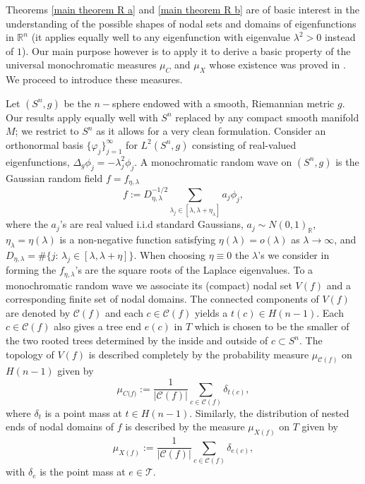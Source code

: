 \documentclass[11pt,reqno]{amsart}
\newcommand{\R}{{\mathbb R}}
\theoremstyle{definition}
\begin{document}
Theorems \ref{main theorem R a} and \ref{main theorem R b}  are of basic interest in the understanding of  the possible shapes of nodal sets and domains of eigenfunctions in $\R^n$ (it applies equally well to any eigenfunction with eigenvalue $\lambda^2>0$ instead of $1$). Our main purpose however is to apply it to derive a basic property of the universal monochromatic measures $\mu_C$ and $\mu_X$ whose existence was proved  in  \cite{SW}.  We proceed to introduce these measures.


Let $(S^n,g)$ be the $n-$sphere endowed with a  smooth, Riemannian metric $g$. Our results apply equally well with $S^n$ replaced by any compact smooth manifold $M$; we restrict to $S^n$ as it allows for a very clean formulation. Consider an orthonormal basis $\{\varphi_j\}_{j=1}^\infty$ for $L^2(S^n,g)$ consisting of real-valued eigenfunctions, 
 $ \Delta_g \phi_j = -\lambda_j^2 \phi_j$.
A monochromatic random wave on $(S^n,g)$ is the Gaussian random  field $f=f_{\eta, \lambda}$
\begin{equation}
f:={D_{\eta, \lambda}^{-1/2}}\sum_{\lambda_j\in [\lambda,  \lambda+\eta_\lambda]} a_j \phi_j,\label{E:RWdef}
\end{equation}
where the $a_j$'s are real valued i.i.d standard Gaussians,  $a_j\sim N(0,1)_{\R}$,  $\eta_\lambda=\eta(\lambda)$ is a non-negative function satisfying $\eta(\lambda)=o(\lambda)$ as $\lambda \to \infty$, and $D_{\eta, \lambda}=\#\{j:\, \lambda_j \in [\lambda, \lambda+\eta]\}$.
 When choosing $\eta \equiv 0$ the $\lambda$'s we consider in forming the $f_{\eta, \lambda}$'s  are the square roots of the Laplace eigenvalues. 
To a monochromatic random wave we associate its (compact) nodal set $V(f)$ and a corresponding finite set of nodal domains. The connected components of $V(f)$ are denoted by $\mathcal C(f)$ and each $c \in \mathcal C(f)$ yields a $t(c) \in H(n-1)$. Each $c\in \mathcal C(f)$ also gives a tree end $e(c)$ in $T$ which is chosen to be the smaller of the two rooted trees determined by the inside and outside of $c \subset S^n$. The topology of $V(f)$ is described completely by the probability measure $\mu_{\mathcal C(f)}$ on $H(n-1)$ given by 
\[\mu_{C\mathcal (f)}:= \frac{1}{|\mathcal C(f)|} \sum_{c \in \mathcal C(f)} \delta_{t(c)},\]
where $\delta_t$ is a point mass at $t\in H(n-1)$.
Similarly, the distribution of nested ends of nodal domains of $f$ is described by the measure $\mu_{X(f)}$ on $T$ given by
\[\mu_{X(f)}:= \frac{1}{|\mathcal C(f)|} \sum_{c \in \mathcal C(f)} \delta_{e(c)},\]
with $\delta_{e}$ is the point mass at $e \in \mathcal T$.
\end{document}
